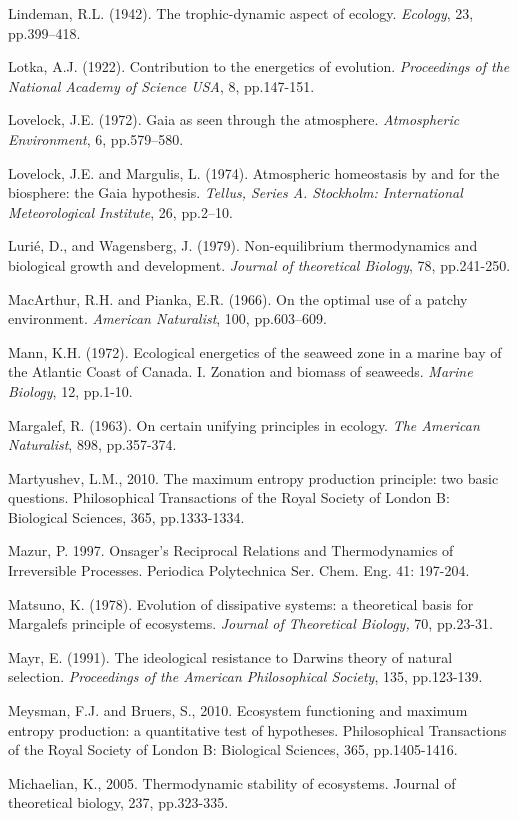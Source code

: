\documentclass[11pt,letterpaper,]{paper}
\begin{document}
Lindeman, R.L. (1942). The trophic-dynamic aspect of ecology.
\emph{Ecology}, 23, pp.399--418.

Lotka, A.J. (1922). Contribution to the energetics of evolution.
\emph{Proceedings of the National Academy of Science USA}, 8,
pp.147-151.

Lovelock, J.E. (1972). Gaia as seen through the atmosphere.
\emph{Atmospheric Environment}, 6, pp.579--580.

Lovelock, J.E. and Margulis, L. (1974). Atmospheric homeostasis by and
for the biosphere: the Gaia hypothesis. \emph{Tellus, Series A.
Stockholm: International Meteorological Institute}, 26, pp.2--10.

Lurié, D., and Wagensberg, J. (1979). Non-equilibrium thermodynamics and
biological growth and development. \emph{Journal of theoretical
Biology}, 78, pp.241-250.

MacArthur, R.H. and Pianka, E.R. (1966). On the optimal use of a patchy
environment. \emph{American Naturalist}, 100, pp.603--609.

Mann, K.H. (1972). Ecological energetics of the seaweed zone in a marine
bay of the Atlantic Coast of Canada. I. Zonation and biomass of
seaweeds. \emph{Marine Biology}, 12, pp.1-10.

Margalef, R. (1963). On certain unifying principles in ecology.
\emph{The American Naturalist}, 898, pp.357-374.

Martyushev, L.M., 2010. The maximum entropy production principle: two
basic questions. Philosophical Transactions of the Royal Society of
London B: Biological Sciences, 365, pp.1333-1334.

Mazur, P. 1997. Onsager's Reciprocal Relations and Thermodynamics of
Irreversible Processes. Periodica Polytechnica Ser. Chem. Eng. 41:
197-204.

Matsuno, K. (1978). Evolution of dissipative systems: a theoretical
basis for Margalef\textquotesingle s principle of ecosystems.
\emph{Journal of Theoretical Biology,} 70, pp.23-31.

Mayr, E. (1991). The ideological resistance to Darwin\textquotesingle s
theory of natural selection. \emph{Proceedings of the American
Philosophical Society}, 135, pp.123-139.

Meysman, F.J. and Bruers, S., 2010. Ecosystem functioning and maximum
entropy production: a quantitative test of hypotheses. Philosophical
Transactions of the Royal Society of London B: Biological Sciences, 365,
pp.1405-1416.

Michaelian, K., 2005. Thermodynamic stability of ecosystems. Journal of
theoretical biology, 237, pp.323-335.
\end{document}
